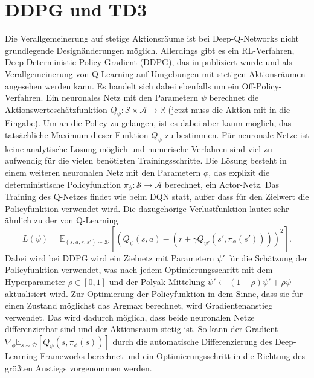 \section{DDPG und TD3}
Die Verallgemeinerung auf stetige Aktionsräume ist bei Deep-Q-Networks nicht grundlegende Designänderungen möglich.
Allerdings gibt es ein RL-Verfahren, Deep Deterministic Policy Gradient (DDPG), das in \cite{10.5555/3044805.3044850} publiziert wurde und als Verallgemeinerung von Q-Learning auf Umgebungen mit stetigen Aktionsräumen angesehen werden kann.
Es handelt sich dabei ebenfalls um ein Off-Policy-Verfahren.
Ein neuronales Netz mit den Parametern $\psi$ berechnet die Aktionswerteschätzfunktion $Q_\psi: \mathcal{S} \times \mathcal{A}\rightarrow \mathbb{R}$ (jetzt muss die Aktion mit in die Eingabe).
Um an die Policy zu gelangen, ist es dabei aber kaum möglich, das tatsächliche Maximum dieser Funktion $Q_\psi$ zu bestimmen.
Für neuronale Netze ist keine analytische Lösung möglich und numerische Verfahren sind viel zu aufwendig für die vielen benötigten Trainingsschritte.
Die Lösung besteht in einem weiteren neuronalen Netz mit den Parametern $\phi$, das explizit die deterministische Policyfunktion $\pi_\phi: \mathcal{S} \rightarrow \mathcal{A}$ berechnet, ein Actor-Netz.
Das Training des Q-Netzes findet wie beim DQN statt, außer dass für den Zielwert die Policyfunktion verwendet wird.
Die dazugehörige Verlustfunktion lautet sehr ähnlich zu der von Q-Learning
\begin{equation}
	L(\psi) = \mathbb{E}_{(s, a, r, s')\sim\mathcal{D}}\left[\left(Q_\psi(s,a)-\left(r+\gamma Q_{\psi'}(s',\pi_\phi(s'))\right)\right)^2\right].
\end{equation}
Dabei wird bei DDPG wird ein Zielnetz mit Parametern $\psi'$ für die Schätzung der Policyfunktion verwendet, was nach jedem Optimierungsschritt mit dem Hyperparameter $\rho \in [0, 1]$ und der Polyak-Mittelung $\psi' \leftarrow (1 - \rho) \psi' + \rho \psi$ aktualisiert wird.
Zur Optimierung der Policyfunktion in dem Sinne, dass sie für einen Zustand möglichst das Argmax berechnet, wird Gradientenanstieg verwendet.
Das wird dadurch möglich, dass beide neuronalen Netze differenzierbar sind und der Aktionsraum stetig ist.
So kann der Gradient $\nabla_\phi \mathbb{E}_{s\sim\mathcal{D}}\left[Q_\psi(s, \pi_\phi(s))\right]$ durch die automatische Differenzierung des Deep-Learning-Frameworks berechnet und ein Optimierungsschritt in die Richtung des größten Anstiegs vorgenommen werden.

